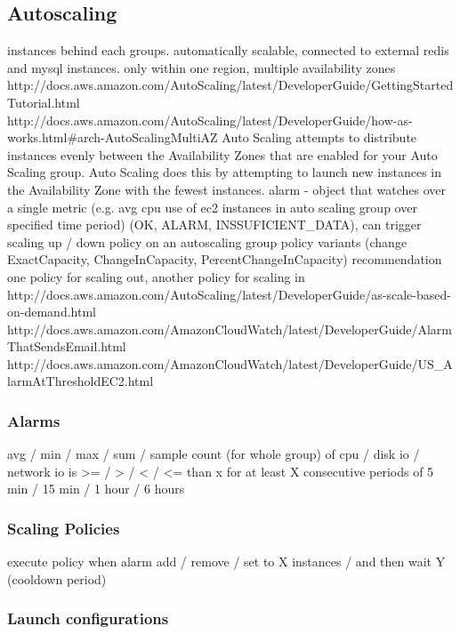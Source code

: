 \documentclass{uvamscse}
\begin{document}
\subsection{Autoscaling}
  instances behind each groups. automatically scalable, connected to external redis and mysql instances.
  only within one region, multiple availability zones
  http://docs.aws.amazon.com/AutoScaling/latest/DeveloperGuide/GettingStartedTutorial.html
  http://docs.aws.amazon.com/AutoScaling/latest/DeveloperGuide/how-as-works.html\#arch-AutoScalingMultiAZ
  Auto Scaling attempts to distribute instances evenly between the Availability Zones that are enabled for your Auto Scaling group. Auto Scaling does this by attempting to launch new instances in the Availability Zone with the fewest instances.
  alarm - object that watches over a single metric (e.g. avg cpu use of ec2 instances in auto scaling group over specified time period) (OK, ALARM, INSSUFICIENT\_DATA), can trigger scaling up / down policy on an autoscaling group
  policy variants (change ExactCapacity, ChangeInCapacity, PercentChangeInCapacity)
  recommendation one policy for scaling out, another policy for scaling in
  http://docs.aws.amazon.com/AutoScaling/latest/DeveloperGuide/as-scale-based-on-demand.html
  http://docs.aws.amazon.com/AmazonCloudWatch/latest/DeveloperGuide/AlarmThatSendsEmail.html
  http://docs.aws.amazon.com/AmazonCloudWatch/latest/DeveloperGuide/US\_AlarmAtThresholdEC2.html
  \subsubsection{Alarms}
  avg / min / max / sum / sample count (for whole group)
  of cpu / disk io / network io
  is >= / > / < / <= than x %
  for at least X consecutive periods of 5 min / 15 min / 1 hour / 6 hours
  \subsubsection{Scaling Policies}
  execute policy when alarm
  add / remove / set to   X   instances / %
  and then wait Y (cooldown period)

  \subsubsection{Launch configurations}
\end{document}
